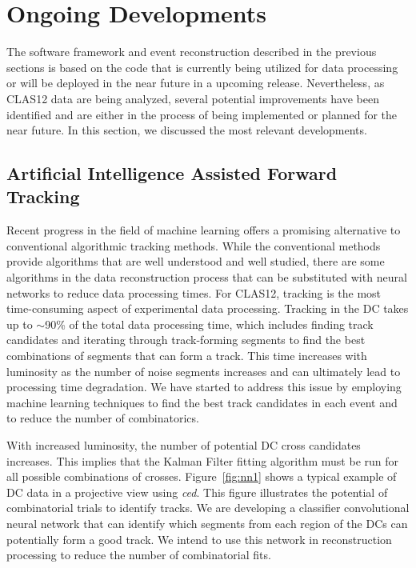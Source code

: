 \section{Ongoing Developments}

The software framework and event reconstruction described in the previous sections is based on the code that
is currently being utilized for data processing or will be deployed in the near future in a upcoming release.
Nevertheless, as CLAS12 data are being analyzed, several potential improvements have been identified and are
either in the process of being implemented or planned for the near future. In this section, we discussed the most
relevant developments.

\subsection{Artificial Intelligence Assisted Forward Tracking}

Recent progress in the field of machine learning offers a promising alternative to conventional algorithmic tracking
methods. While the conventional methods provide algorithms that are well understood and well studied, there are
some algorithms in the data reconstruction process that can be substituted with neural networks to reduce data
processing times. For CLAS12, tracking is the most time-consuming aspect of experimental data processing.
Tracking in the DC takes up to $\sim$90\% of the total data processing time, which includes finding track
candidates and iterating through track-forming segments to find the best combinations of segments that can form
a track. This time increases with luminosity as the number of noise segments increases and can ultimately lead to
processing time degradation. We have started to address this issue by employing machine learning techniques
to find the best track candidates in each event and to reduce the number of combinatorics.

With increased luminosity, the number of potential DC cross candidates increases. This implies that the Kalman
Filter fitting algorithm must be run for all possible combinations of crosses. Figure~\ref{fig:nn1} shows a typical
example of DC data in a projective view using {\it ced}. This figure illustrates the potential of combinatorial trials
to identify tracks. We are developing a classifier convolutional neural network that can identify which segments
from each region of the DCs can potentially form a good track. We intend to use this network in reconstruction
processing to reduce the number of combinatorial fits.

